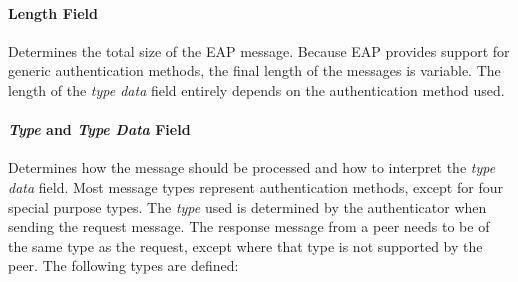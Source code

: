 \paragraph{Length Field}
Determines the total size of the EAP message. Because EAP provides support for generic authentication methods, the final length of the messages is variable.
The length of the \textit{type data} field entirely depends on the authentication method used.

\paragraph{\textit{Type} and \textit{Type Data} Field}
\label{text:eap:type}
Determines how the message should be processed and how to interpret the \textit{type data} field.
Most message types represent authentication methods, except for four special purpose types.
The \textit{type} used is determined by the authenticator when sending the request message. The response message from a peer needs to be of the same type as the request, except where that type is not supported by the peer.
The following types are defined:

